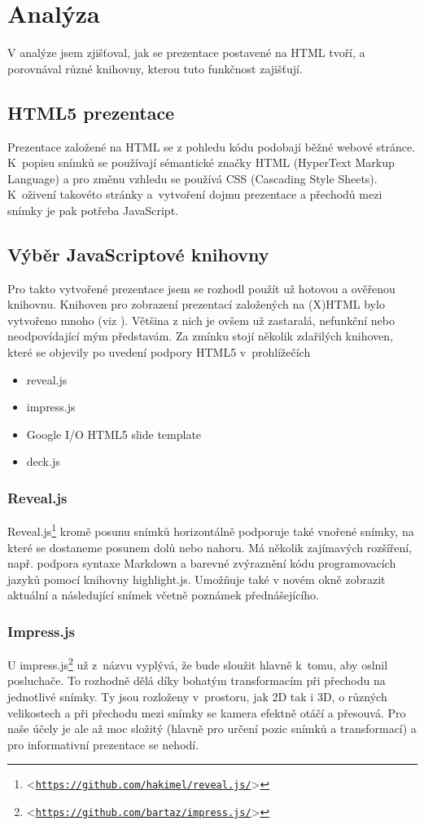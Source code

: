 \documentclass[11pt,twoside,a4paper]{book}
\let\oldUrl\url									%
\renewcommand\url[1]{<\texttt{\oldUrl{#1}}>}
\begin{document}
\chapter{Analýza}
V analýze jsem zjišťoval, jak se prezentace postavené na HTML tvoří, a porovnával různé knihovny, kterou tuto funkčnost zajišťují.


\section{HTML5 prezentace}
Prezentace založené na HTML se z pohledu kódu podobají běžné webové stránce. K~popisu snímků se používají sémantické značky HTML (HyperText Markup Language) a pro změnu vzhledu se používá CSS (Cascading Style Sheets). K~oživení takovéto stránky a~vytvoření dojmu prezentace a přechodů mezi snímky je pak potřeba JavaScript.


\section{Výběr JavaScriptové knihovny}
Pro takto vytvořené prezentace jsem se rozhodl použít už hotovou a ověřenou knihovnu. Knihoven pro zobrazení prezentací založených na (X)HTML bylo vytvořeno mnoho (viz \cite{htmlslideshowweb}). Většina z nich je ovšem už zastaralá, nefunkční nebo neodpovídající mým představám. Za zmínku stojí několik zdařilých knihoven, které se objevily po uvedení podpory HTML5 v~prohlížečích

\begin{itemize}
\item reveal.js
\item impress.js
\item Google I/O HTML5 slide template
\item deck.js
\end{itemize}

\subsection{Reveal.js}
Reveal.js\footnote{\url{https://github.com/hakimel/reveal.js/}} kromě posunu snímků horizontálně podporuje také vnořené snímky, na které se dostaneme posunem dolů nebo nahoru. Má několik zajímavých rozšíření, např. podpora syntaxe Markdown a barevné zvýraznění kódu programovacích jazyků pomocí knihovny highlight.js. Umožňuje také v novém okně zobrazit aktuální a následující snímek včetně poznámek přednášejícího.

\subsection{Impress.js}
U impress.js\footnote{\url{https://github.com/bartaz/impress.js/}} už z~názvu vyplývá, že bude sloužit hlavně k~tomu, aby oslnil posluchače. To rozhodně dělá díky bohatým transformacím při přechodu na jednotlivé snímky. Ty jsou rozloženy v~prostoru, jak 2D tak i 3D, o různých velikostech a při přechodu mezi snímky se kamera efektně otáčí a přesouvá. Pro naše účely je ale až moc složitý (hlavně pro určení pozic snímků a transformací) a pro informativní prezentace se nehodí.
\end{document}
